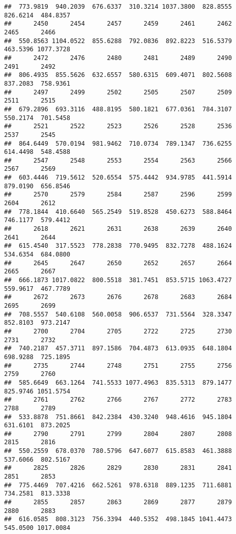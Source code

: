 \documentclass[
]{article}
\begin{document}
\begin{verbatim}
##  773.9819  940.2039  676.6337  310.3214 1037.3800  828.8555  826.6214  484.8357 
##      2450      2454      2457      2459      2461      2462      2465      2466 
##  550.8563 1104.0522  855.6288  792.0836  892.8223  516.5379  463.5396 1077.3728 
##      2472      2476      2480      2481      2489      2490      2491      2492 
##  806.4935  855.5626  632.6557  580.6315  609.4071  802.5608  837.2083  758.9361 
##      2497      2499      2502      2505      2507      2509      2511      2515 
##  679.2896  693.3116  488.8195  580.1821  677.0361  784.3107  550.2174  701.5458 
##      2521      2522      2523      2526      2528      2536      2537      2545 
##  864.6449  570.0194  981.9462  710.0734  789.1347  736.6255  614.4498  548.4588 
##      2547      2548      2553      2554      2563      2566      2567      2569 
##  603.4446  719.5612  520.6554  575.4442  934.9785  441.5914  879.0190  656.8546 
##      2570      2579      2584      2587      2596      2599      2604      2612 
##  778.1844  410.6640  565.2549  519.8528  450.6273  588.8464  746.1177  579.4412 
##      2618      2621      2631      2638      2639      2640      2641      2644 
##  615.4540  317.5523  778.2838  770.9495  832.7278  488.1624  534.6354  684.0800 
##      2645      2647      2650      2652      2657      2664      2665      2667 
##  666.1873 1017.0822  800.5518  381.7451  853.5715 1063.4727  559.9617  467.7789 
##      2672      2673      2676      2678      2683      2684      2695      2699 
##  708.5557  540.6108  560.0058  906.6537  731.5564  328.3347  852.8103  973.2147 
##      2700      2704      2705      2722      2725      2730      2731      2732 
##  740.2187  457.3711  897.1586  704.4873  613.0935  648.1804  698.9288  725.1895 
##      2735      2744      2748      2751      2755      2756      2759      2760 
##  585.6649  663.1264  741.5533 1077.4963  835.5313  879.1477  825.9746 1051.5754 
##      2761      2762      2766      2767      2772      2783      2788      2789 
##  533.8878  751.8661  842.2384  430.3240  948.4616  945.1804  631.6101  873.2025 
##      2790      2791      2799      2804      2807      2808      2815      2816 
##  550.2559  678.0370  780.5796  647.6077  615.8583  461.3888  537.6066  802.5167 
##      2825      2826      2829      2830      2831      2841      2851      2853 
##  775.4469  707.4216  662.5261  978.6318  889.1235  711.6881  734.2581  813.3338 
##      2855      2857      2863      2869      2877      2879      2880      2883 
##  616.0585  808.3123  756.3394  440.5352  498.1845 1041.4473  545.0500 1017.0084 

\end{verbatim}
\end{document}
